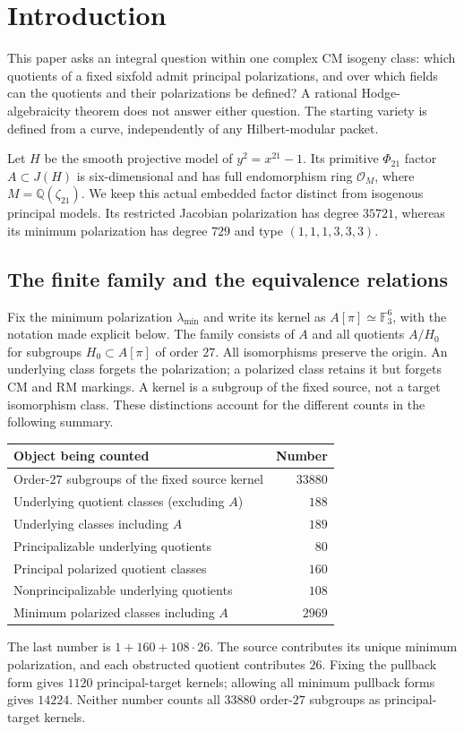 \section{Introduction}
This paper asks an integral question within one complex CM isogeny class:
which quotients of a fixed sixfold admit principal polarizations, and over
which fields can the quotients and their polarizations be defined? A
rational Hodge-algebraicity theorem does not answer either question.
The starting variety is defined from a curve, independently of any
Hilbert-modular packet.

Let $H$ be the smooth projective model of $y^2=x^{21}-1$. Its primitive
$\Phi_{21}$ factor $A\subset J(H)$ is six-dimensional and has full
endomorphism ring $\mathcal O_M$, where $M=\mathbb Q(\zeta_{21})$.
We keep this actual embedded factor distinct from isogenous principal
models. Its restricted Jacobian polarization has degree $35721$, whereas
its minimum polarization has degree $729$ and type $(1,1,1,3,3,3)$.

\subsection{The finite family and the equivalence relations}
Fix the minimum polarization $\lambda_{\min}$ and write its kernel as
$A[\pi]\simeq\mathbb F_3^6$, with the notation made explicit below.
The family consists of $A$ and all quotients $A/H_0$ for subgroups
$H_0\subset A[\pi]$ of order $27$. All isomorphisms preserve the origin.
An underlying class forgets the polarization; a polarized class retains
it but forgets CM and RM markings. A kernel is a subgroup of the fixed
source, not a target isomorphism class. These distinctions account for the
different counts in the following summary.

\begin{center}
\begin{tabular}{lr}
\toprule
Object being counted & Number\\\midrule
Order-$27$ subgroups of the fixed source kernel & $33880$\\
Underlying quotient classes (excluding $A$) & $188$\\
Underlying classes including $A$ & $189$\\
Principalizable underlying quotients & $80$\\
Principal polarized quotient classes & $160$\\
Nonprincipalizable underlying quotients & $108$\\
Minimum polarized classes including $A$ & $2969$\\\bottomrule
\end{tabular}
\end{center}
The last number is $1+160+108\cdot26$. The source contributes its unique
minimum polarization, and each obstructed quotient contributes $26$.
Fixing the pullback form gives $1120$ principal-target kernels; allowing
all minimum pullback forms gives $14224$. Neither number counts all
$33880$ order-$27$ subgroups as principal-target kernels.

